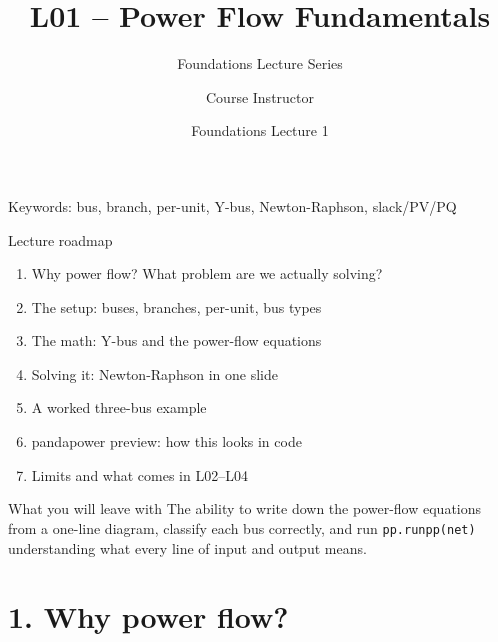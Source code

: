 \documentclass[aspectratio=169,10pt]{beamer}
\title[L01: PF Fundamentals]{L01 -- Power Flow Fundamentals}
\subtitle{Foundations Lecture Series}
\author{Course Instructor}
\institute{Microgrid 3-phase Security AI Project}
\date{Foundations Lecture 1}
\newcommand{\code}[1]{\texttt{#1}}
\begin{document}
\begin{frame}
  \titlepage
  \vspace{-0.8em}
  \begin{center}
    \small Keywords: bus, branch, per-unit, Y-bus, Newton-Raphson, slack/PV/PQ
  \end{center}
\end{frame}

\begin{frame}{Lecture roadmap}
\begin{enumerate}
  \item Why power flow? What problem are we actually solving?
  \item The setup: buses, branches, per-unit, bus types
  \item The math: Y-bus and the power-flow equations
  \item Solving it: Newton-Raphson in one slide
  \item A worked three-bus example
  \item pandapower preview: how this looks in code
  \item Limits and what comes in L02--L04
\end{enumerate}
\vspace{0.6em}
\begin{block}{What you will leave with}
The ability to write down the power-flow equations from a one-line diagram, classify each bus correctly, and run \code{pp.runpp(net)} understanding what every line of input and output means.
\end{block}
\end{frame}

\section*{1. Why power flow?}
\end{document}
